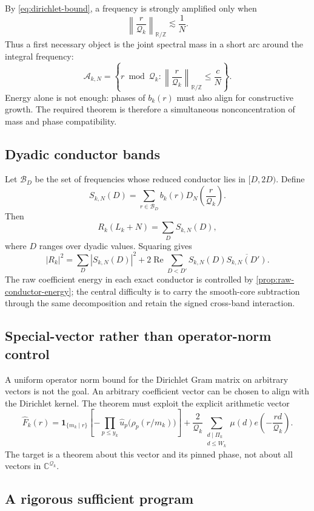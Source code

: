 \documentclass[11pt]{article}
\theoremstyle{definition}
\newcommand{\Z}{\mathbb Z}
\newcommand{\C}{\mathbb C}
\newcommand{\R}{\mathbb R}
\newcommand{\one}{\mathbf 1}
\newcommand{\Rea}{\operatorname{Re}}
\begin{document}
By \eqref{eq:dirichlet-bound}, a frequency is strongly amplified only when
\[
\left\|\frac r{\mathcal Q_k}\right\|_{\R/\Z}\lesssim\frac1N.
\]
Thus a first necessary object is the joint spectral mass in a short arc around the integral frequency:
\[
\mathcal A_{k,N}
=\left\{r\bmod\mathcal Q_k:
\left\|\frac r{\mathcal Q_k}\right\|_{\R/\Z}\le\frac{c}{N}\right\}.
\]
Energy alone is not enough: phases of $b_k(r)$ must also align for constructive growth.  The required theorem is therefore a simultaneous nonconcentration of mass and phase compatibility.

\subsection{Dyadic conductor bands}

Let $\mathcal B_D$ be the set of frequencies whose reduced conductor lies in $[D,2D)$.  Define
\[
S_{k,N}(D)=
\sum_{r\in\mathcal B_D}b_k(r)D_N\!\left(\frac r{\mathcal Q_k}\right).
\]
Then
\[
R_k(L_k+N)=\sum_D S_{k,N}(D),
\]
where $D$ ranges over dyadic values.  Squaring gives
\begin{equation}\label{eq:band-gram}
|R_k|^2
=
\sum_D|S_{k,N}(D)|^2
+2\Rea\sum_{D<D'}S_{k,N}(D)\overline{S_{k,N}(D')}.
\end{equation}
The raw coefficient energy in each exact conductor is controlled by \cref{prop:raw-conductor-energy}; the central difficulty is to carry the smooth-core subtraction through the same decomposition and retain the signed cross-band interaction.

\subsection{Special-vector rather than operator-norm control}

A uniform operator norm bound for the Dirichlet Gram matrix on arbitrary vectors is not the goal.  An arbitrary coefficient vector can be chosen to align with the Dirichlet kernel.  The theorem must exploit the explicit arithmetic vector
\[
\widehat F_k(r)
=
\one_{\{m_k\mid r\}}
\left[-\prod_{p\le y_k}\widehat u_p\bigl(\rho_p(r/m_k)\bigr)\right]
+
\frac{2}{\mathcal Q_k}
\sum_{\substack{d\mid\Pi_k\\d\le W_k}}
\mu(d)e\!\left(-\frac{rd}{\mathcal Q_k}\right).
\]
The target is a theorem about this vector and its pinned phase, not about all vectors in $\C^{\mathcal Q_k}$.

\subsection{A rigorous sufficient program}
\end{document}
